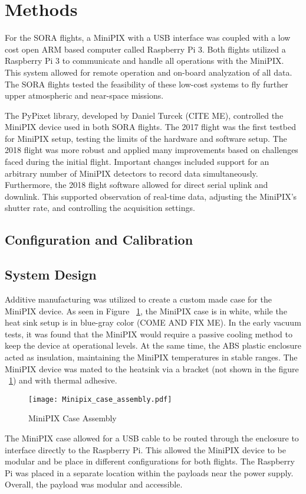 \section{Methods}
\label{Methods}
For the SORA flights, a MiniPIX with a USB interface was coupled with a low cost open ARM based computer called Raspberry Pi 3.  Both flights utilized a Raspberry Pi 3 to communicate and handle all operations with the MiniPIX.  This system allowed for remote operation and on-board analyzation of all data.  The SORA flights tested the feasibility of these low-cost systems to fly further upper atmospheric and near-space missions.  

The PyPixet library, developed by Daniel Turcek (CITE ME), controlled the MiniPIX device used in both SORA flights.  The 2017 flight was the first testbed for MiniPIX setup, testing the limits of the hardware and software setup.  The 2018 flight was more robust and applied many improvements based on challenges faced during the initial flight.  Important changes included support for an arbitrary number of MiniPIX detectors to record data simultaneously.  Furthermore, the 2018 flight software allowed for direct serial uplink and downlink. This supported observation of real-time data, adjusting the MiniPIX's shutter rate, and controlling the acquisition settings.

\subsection{Configuration and Calibration}
\subsection{System Design}
Additive manufacturing was utilized to create a custom made case for the MiniPIX device.  As seen in Figure ~\ref{fig:minipix_case}, the MiniPIX case is in white, while the heat sink setup is in blue-gray color (COME AND FIX ME).  In the early vacuum tests, it was found that the MiniPIX would require a passive cooling method to keep the device at operational levels.  At the same time, the ABS plastic enclosure acted as insulation, maintaining the MiniPIX temperatures in stable ranges.  The MiniPIX device was mated to the heatsink via a bracket (not shown in the figure ~\ref{fig:minipix_case}) and with thermal adhesive.
\begin{figure}[h]
    \centering
    \texttt{[image: Minipix\_case\_assembly.pdf]}
    \caption{MiniPIX Case Assembly}
    \label{fig:minipix_case}
\end{figure}
The MiniPIX case allowed for a USB cable to be routed through the enclosure to interface directly to the Raspberry Pi.  This allowed the MiniPIX device to be modular and be place in different configurations for both flights.  The Raspberry Pi was placed in a separate location within the payloads near the power supply.  Overall, the payload was modular and accessible.



